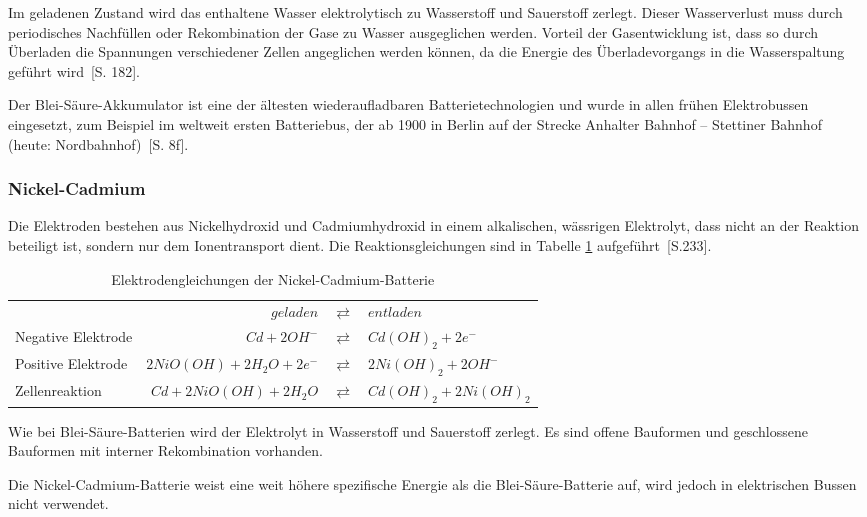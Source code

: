 Im geladenen Zustand wird das enthaltene Wasser elektrolytisch zu Wasserstoff und Sauerstoff zerlegt. Dieser Wasserverlust muss durch periodisches Nachfüllen oder Rekombination der Gase zu Wasser ausgeglichen werden. Vorteil der Gasentwicklung ist, dass so durch Überladen die Spannungen verschiedener Zellen angeglichen werden können, da die Energie des Überladevorgangs in die Wasserspaltung geführt wird~\cite{tub_aleph001746639}[S. 182].

Der Blei-Säure-Akkumulator ist eine der ältesten wiederaufladbaren Batterietechnologien und wurde in allen frühen Elektrobussen eingesetzt, zum Beispiel im weltweit ersten Batteriebus, der ab 1900 in Berlin auf der Strecke Anhalter Bahnhof – Stettiner Bahnhof (heute: Nordbahnhof)~\cite{Risch:1957}[S. 8f].

\subsubsection{Nickel-Cadmium}
Die Elektroden bestehen aus Nickelhydroxid und Cadmiumhydroxid in einem alkalischen, wässrigen Elektrolyt, dass nicht an der Reaktion beteiligt ist, sondern nur dem Ionentransport dient. Die Reaktionsgleichungen sind in Tabelle \ref{NiCd} aufgeführt~\cite{Sterner:2014}[S.233].

\begin{table}\centering
	\begin{tabularx}{\linewidth}{XrcX}
		\toprule
		&               $geladen$ & $\rightleftarrows$ & $entladen$             \\
		Negative Elektrode &            $Cd + 2OH^-$ & $\rightleftarrows$ & $Cd(OH)_2 + 2e^-$      \\
		Positive Elektrode & $2NiO(OH) + 2H_2O + 2e^-$ & $\rightleftarrows$ & $2Ni(OH)_2 + 2OH^-$    \\ \midrule
		Zellenreaktion     &   $Cd + 2NiO(OH) + 2H_2O$ & $\rightleftarrows$ & $Cd(OH)_2 + 2Ni(OH)_2$ \\ \bottomrule
	\end{tabularx}
	\caption{Elektrodengleichungen der Nickel-Cadmium-Batterie}
	\label{NiCd}
\end{table}

Wie bei Blei-Säure-Batterien wird der Elektrolyt in Wasserstoff und Sauerstoff zerlegt. Es sind offene Bauformen und geschlossene Bauformen mit interner Rekombination vorhanden.

Die Nickel-Cadmium-Batterie weist eine weit höhere spezifische Energie als die Blei-Säure-Batterie auf, wird jedoch in elektrischen Bussen nicht verwendet. 

